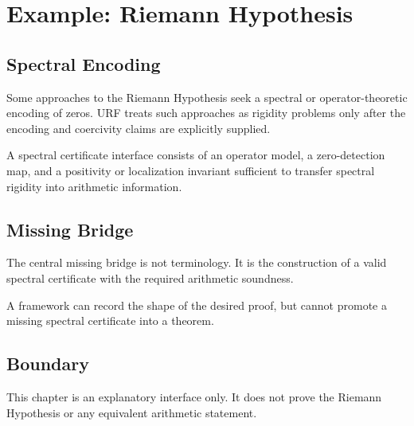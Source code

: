 \chapter{Example: Riemann Hypothesis}

\section{Spectral Encoding}

Some approaches to the Riemann Hypothesis seek a spectral or operator-theoretic encoding of zeros.  URF treats such approaches as rigidity problems only after the encoding and coercivity claims are explicitly supplied.

\begin{definition}
A spectral certificate interface consists of an operator model, a zero-detection map, and a positivity or localization invariant sufficient to transfer spectral rigidity into arithmetic information.
\end{definition}

\section{Missing Bridge}

The central missing bridge is not terminology.  It is the construction of a valid spectral certificate with the required arithmetic soundness.

\begin{remark}
A framework can record the shape of the desired proof, but cannot promote a missing spectral certificate into a theorem.
\end{remark}

\section{Boundary}

This chapter is an explanatory interface only.  It does not prove the Riemann Hypothesis or any equivalent arithmetic statement.
